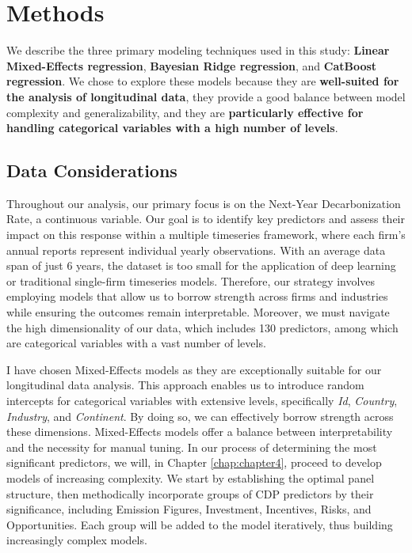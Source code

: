 \chapter{Methods}

\begin{keytakeaway}
    We describe the three primary modeling techniques used in this study: \textbf{Linear Mixed-Effects regression}, \textbf{Bayesian Ridge regression}, and \textbf{CatBoost regression}. We chose to explore these models because they are \textbf{well-suited for the analysis of longitudinal data}, they provide a good balance between model complexity and generalizability, and they are \textbf{particularly effective for handling categorical variables with a high number of levels}.
\end{keytakeaway}

\section{Data Considerations}
Throughout our analysis, our primary focus is on the Next-Year Decarbonization Rate, a continuous variable. Our goal is to identify key predictors and assess their impact on this response within a multiple timeseries framework, where each firm's annual reports represent individual yearly observations. With an average data span of just 6 years, the dataset is too small for the application of deep learning or traditional single-firm timeseries models. Therefore, our strategy involves employing models that allow us to borrow strength across firms and industries while ensuring the outcomes remain interpretable. Moreover, we must navigate the high dimensionality of our data, which includes 130 predictors, among which are categorical variables with a vast number of levels.

I have chosen Mixed-Effects models as they are exceptionally suitable for our longitudinal data analysis. This approach enables us to introduce random intercepts for categorical variables with extensive levels, specifically \textit{Id}, \textit{Country}, \textit{Industry}, and \textit{Continent}. By doing so, we can effectively borrow strength across these dimensions. Mixed-Effects models offer a balance between interpretability and the necessity for manual tuning. In our process of determining the most significant predictors, we will, in Chapter \ref{chap:chapter4}, proceed to develop models of increasing complexity. We start by establishing the optimal panel structure, then methodically incorporate groups of CDP predictors by their significance, including Emission Figures, Investment, Incentives, Risks, and Opportunities. Each group will be added to the model iteratively, thus building increasingly complex models. 

